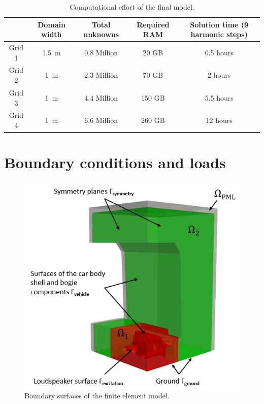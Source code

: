 \begin{table}[H]
	\centering
	\caption{Computational effort of the final model.}
	\label{tab:computational_effort}
	\begin{tabular}{ccccc}
		\toprule
		& Domain width & Total unknowns & Required RAM & Solution time (9 harmonic steps) \\
		\midrule
		Grid 1 & \SI{1.5}{\meter} & 0.8 Million & 20 GB & 0.5 hours \\
		Grid 2 & \SI{1}{\meter} & 2.3 Million & 70 GB & 2 hours \\
		Grid 3 & \SI{1}{\meter} & 4.4 Million & 150 GB & 5.5 hours \\
		Grid 4 & \SI{1}{\meter} & 6.6 Million & 260 GB & 12 hours \\
		\bottomrule
	\end{tabular}
\end{table}



\newpage
\section{Boundary conditions and loads}
\label{section:boundary_conditions}

\begin{figure}
	\centering
	\includegraphics{fig/chap4/region_labels.png}
	\caption{Boundary surfaces of the finite element model.}
	\label{fig:boundary_conditions}
\end{figure}

